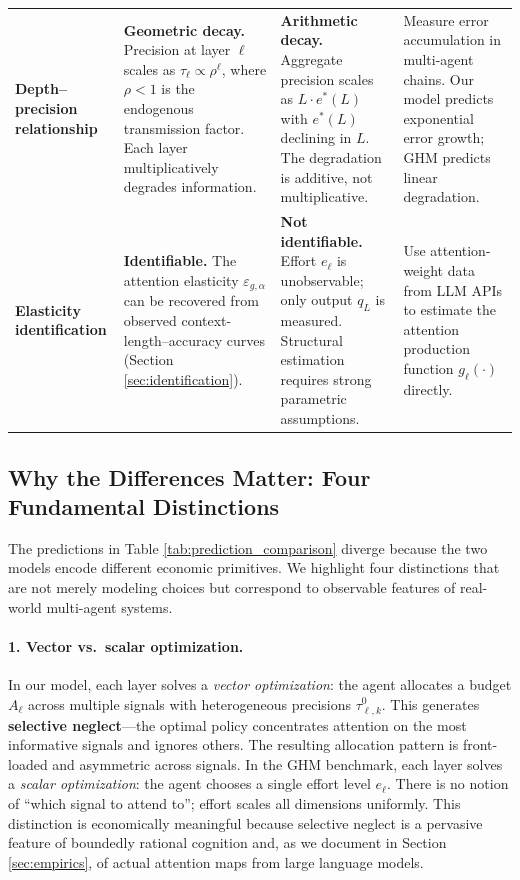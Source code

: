 \begin{table}[htbp]
\begin{tabular}{@{}p{4.2cm}p{3.8cm}p{3.8cm}p{4.0cm}@{}}
\addlinespace
\midrule
\addlinespace
\textbf{Depth--precision relationship} &
\textbf{Geometric decay.} Precision at layer $\ell$ scales as $\tau_\ell \propto \rho^{\ell}$, where $\rho < 1$ is the endogenous transmission factor. Each layer multiplicatively degrades information. &
\textbf{Arithmetic decay.} Aggregate precision scales as $L \cdot e^*(L)$ with $e^*(L)$ declining in $L$. The degradation is additive, not multiplicative. &
Measure error accumulation in multi-agent chains. Our model predicts exponential error growth; GHM predicts linear degradation. \\
\addlinespace
\midrule
\addlinespace
\textbf{Elasticity identification} &
\textbf{Identifiable.} The attention elasticity $\varepsilon_{g,\alpha}$ can be recovered from observed context-length--accuracy curves (Section \ref{sec:identification}). &
\textbf{Not identifiable.} Effort $e_\ell$ is unobservable; only output $q_L$ is measured. Structural estimation requires strong parametric assumptions. &
Use attention-weight data from LLM APIs to estimate the attention production function $g_\ell(\cdot)$ directly. \\
\bottomrule
\end{tabular}
\end{table}


\subsection{Why the Differences Matter: Four Fundamental Distinctions}
\label{sec:key_distinctions}

The predictions in Table \ref{tab:prediction_comparison} diverge because the two models encode different economic primitives. We highlight four distinctions that are not merely modeling choices but correspond to observable features of real-world multi-agent systems.

\paragraph{1. Vector vs.~scalar optimization.} In our model, each layer solves a \emph{vector optimization}: the agent allocates a budget $A_\ell$ across multiple signals with heterogeneous precisions $\tau^0_{\ell,k}$. This generates \textbf{selective neglect}---the optimal policy concentrates attention on the most informative signals and ignores others. The resulting allocation pattern is front-loaded and asymmetric across signals. In the GHM benchmark, each layer solves a \emph{scalar optimization}: the agent chooses a single effort level $e_\ell$. There is no notion of ``which signal to attend to''; effort scales all dimensions uniformly. This distinction is economically meaningful because selective neglect is a pervasive feature of boundedly rational cognition \citep{sims2003implications} and, as we document in Section \ref{sec:empirics}, of actual attention maps from large language models.

